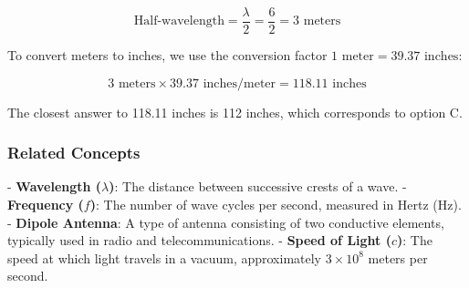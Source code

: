 \[
\text{Half-wavelength} = \frac{\lambda}{2} = \frac{6}{2} = 3 \text{ meters}
\]

To convert meters to inches, we use the conversion factor \(1 \text{ meter} = 39.37 \text{ inches}\):

\[
3 \text{ meters} \times 39.37 \text{ inches/meter} = 118.11 \text{ inches}
\]

The closest answer to 118.11 inches is 112 inches, which corresponds to option C.

\subsubsection*{Related Concepts}
- \textbf{Wavelength (\(\lambda\))}: The distance between successive crests of a wave.
- \textbf{Frequency (\(f\))}: The number of wave cycles per second, measured in Hertz (Hz).
- \textbf{Dipole Antenna}: A type of antenna consisting of two conductive elements, typically used in radio and telecommunications.
- \textbf{Speed of Light (\(c\))}: The speed at which light travels in a vacuum, approximately \(3 \times 10^8\) meters per second.

